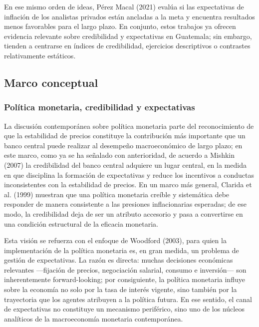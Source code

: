 \documentclass[
  10.5pt,
  letterpaper,
  twocolumn]{article}
\begin{document}
En ese mismo orden de ideas, Pérez Macal (2021) evalúa si las
expectativas de inflación de los analistas privados están ancladas a la
meta y encuentra resultados menos favorables para el largo plazo. En
conjunto, estos trabajos ya ofrecen evidencia relevante sobre
credibilidad y expectativas en Guatemala; sin embargo, tienden a
centrarse en índices de credibilidad, ejercicios descriptivos o
contrastes relativamente estáticos.

\subsection{Marco conceptual}\label{marco-conceptual}

\subsubsection{Política monetaria, credibilidad y
expectativas}\label{poluxedtica-monetaria-credibilidad-y-expectativas}

La discusión contemporánea sobre política monetaria parte del
reconocimiento de que la estabilidad de precios constituye la
contribución más importante que un banco central puede realizar al
desempeño macroeconómico de largo plazo; en este marco, como ya se ha
señalado con anterioridad, de acuerdo a Mishkin (2007) la credibilidad
del banco central adquiere un lugar central, en la medida en que
disciplina la formación de expectativas y reduce los incentivos a
conductas inconsistentes con la estabilidad de precios. En un marco más
general, Clarida et al. (1999) muestran que una política monetaria
creíble y sistemática debe responder de manera consistente a las
presiones inflacionarias esperadas; de ese modo, la credibilidad deja de
ser un atributo accesorio y pasa a convertirse en una condición
estructural de la eficacia monetaria.

Esta visión se refuerza con el enfoque de Woodford (2003), para quien la
implementación de la política monetaria es, en gran medida, un problema
de gestión de expectativas. La razón es directa: muchas decisiones
económicas relevantes ---fijación de precios, negociación salarial,
consumo e inversión--- son inherentemente forward-looking; por
consiguiente, la política monetaria influye sobre la economía no solo
por la tasa de interés vigente, sino también por la trayectoria que los
agentes atribuyen a la política futura. En ese sentido, el canal de
expectativas no constituye un mecanismo periférico, sino uno de los
núcleos analíticos de la macroeconomía monetaria contemporánea.
\end{document}
